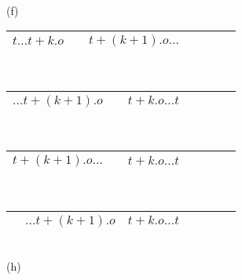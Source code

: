 \begin{minipage}[t]{0.5\textwidth}
\begin{center}
\begin{tabular}{ |c|c|c|c|c|c|c }
 \hline
\end{tabular} \\ 
(f) 
\\[0.1in]
\begin{tabular}{ |c|c|c|c|c|c|c| } 
 \hline
 $t\ldots t+k.o$ & \hspace*{0.1cm} & $t+(k+1).o \ldots$ & \hspace{0.1cm} \\ 
 \hline
\end{tabular} \\ 
\begin{tabular}{ |c|c|c|c|c|c|c| } 
 \hline
 $\ldots t+(k+1).o$ & \hspace*{0.1cm} & $t+k.o \ldots t$ & \hspace{0.1cm} \\ 
 \hline
\end{tabular} \\ 
\begin{tabular}{ |c|c|c|c|c|c|c| } 
 \hline
 $t+(k+1).o \ldots$ & \hspace*{0.1cm} & $t+k.o \ldots t$ & \hspace{0.1cm} \\ 
 \hline
\end{tabular} \\
\begin{tabular}{ |c|c|c|c|c|c|c| } 
 \hline
 \hspace*{0.1cm} & $\ldots t+(k+1).o$ & $t+k.o \ldots t$ & \hspace{0.1cm} \\ 
 \hline
\end{tabular} \\
(h)
\\
\end{center}
\end{minipage}
